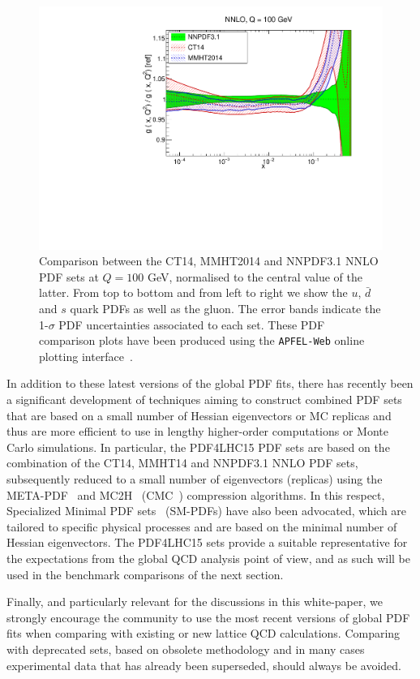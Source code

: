 \begin{figure}[t]
\begin{center}
   \includegraphics[scale=0.37]{plots/xg-31-nnlo-globalfits.pdf}
  \caption{\small Comparison between the CT14, MMHT2014
  and NNPDF3.1 NNLO PDF sets at $Q=100$ GeV, normalised
  to the central value of the latter.
  From top to bottom and from left to right we show the
  $u$, $\bar{d}$ and $s$ quark PDFs as well as the gluon.
  The error bands indicate the 1-$\sigma$ PDF uncertainties
  associated to each set.
  These PDF comparison plots have been produced using the
  {\tt APFEL-Web} online plotting interface~\cite{Carrazza:2014gfa}.
    \label{fig:globalfits}
  }
\end{center}
\end{figure}

In addition to these latest versions of the global PDF fits,
there has recently been a significant development of techniques aiming
to construct combined PDF sets that are based on
a small number of Hessian eigenvectors or MC replicas and thus
are more efficient to use in lengthy higher-order
computations or Monte Carlo simulations.
%
In particular, the PDF4LHC15 PDF sets are based on the
combination of the CT14, MMHT14 and NNPDF3.1 NNLO PDF sets,
subsequently reduced to a small number of eigenvectors
(replicas) using the META-PDF~\cite{Gao:2013bia}
and MC2H~\cite{Carrazza:2015aoa}
(CMC~\cite{Carrazza:2015hva}) compression algorithms.
%
In this respect, Specialized Minimal PDF sets~\cite{Carrazza:2016htc}
(SM-PDFs) have also
been advocated, which
are tailored to specific physical processes and are based
on the minimal number of Hessian eigenvectors.
%
The PDF4LHC15 sets provide a suitable representative for the expectations
from the global QCD analysis point of view, and as such will be used
in the benchmark comparisons of the next section.

Finally, and particularly relevant for the discussions in this white-paper,
we strongly encourage the community to use the most recent versions
of global PDF fits when comparing with existing or new
lattice QCD calculations.
%
Comparing with deprecated sets, based on obsolete methodology
and in many cases experimental data that has already been
superseded, should always be avoided.
